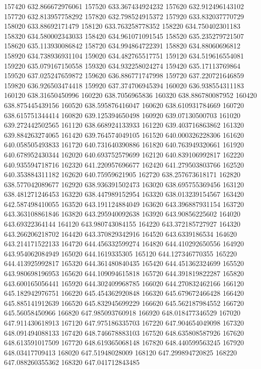 {157420 632.866672976061
157520 633.367434924232
157620 632.912496143102
157720 632.813957758292
157820 632.798524915372
157920 633.832037770729
158020 633.88692171479
158120 633.763258778352
158220 634.750402301183
158320 634.580002343033
158420 634.961071091545
158520 635.235279721507
158620 635.113930086842
158720 634.994864722391
158820 634.88060696812
158920 634.738936931104
159020 634.482765517751
159120 634.519616554081
159220 635.079167150558
159320 634.932258024274
159420 635.17113769864
159520 637.025247659872
159620 636.886771747998
159720 637.220721646859
159820 636.926503474418
159920 637.374706945394
160020 636.938554311183
160120 638.31650450996
160220 638.7056965836
160320 638.886780087952
160420 638.875445439156
160520 638.595876416047
160620 638.610931784669
160720 638.615751344414
160820 639.125394650498
160920 639.07130500703
161020 639.272442502565
161120 638.668924133933
161220 639.403716863862
161320 639.884263274065
161420 639.764574049105
161520 640.000326228306
161620 640.058505493833
161720 640.731640390886
161820 640.763949320661
161920 640.678952430344
162020 640.693752579699
162120 640.839106992817
162220 640.935594718716
162320 641.220957696677
162420 641.279503803766
162520 640.353884311182
162620 640.75959621905
162720 638.257673618171
162820 638.577042089677
162920 638.936391502473
163020 638.695755369456
163120 638.481271246453
163220 638.447989152954
163320 638.013239154567
163420 642.587498410055
163520 643.191124884049
163620 643.396887931154
163720 643.363108861846
163820 643.295940092638
163920 643.90856225602
164020 643.69322364144
164120 643.980743084155
164220 643.372185727927
164320 643.266206218702
164420 643.370829342916
164520 643.6339186534
164620 643.214171522133
164720 644.456332599274
164820 644.410292650556
164920 643.954062084949
165020 644.1619335305
165120 644.127346770355
165220 644.413925992817
165320 644.361480840435
165420 644.451362324699
165520 643.980698196953
165620 644.109094615818
165720 644.391819822287
165820 643.600165056441
165920 644.302409968785
166020 644.270832462166
166120 645.182942976751
166220 645.454362920848
166320 645.679672466428
166420 645.885141912639
166520 645.832945699229
166620 645.562187984552
166720 645.56058450966
166820 647.985093760918
166920 648.018477346529
167020 647.911430618913
167120 647.975186335703
167220 647.904654049098
167320 648.091494088133
167420 648.746678883103
167520 648.635808587926
167620 648.613591017509
167720 648.619365068148
167820 648.440599563245
167920 648.03417709413
168020 647.51948028009
168120 647.299894720825
168220 647.088260355362
168320 647.041712843485
}

